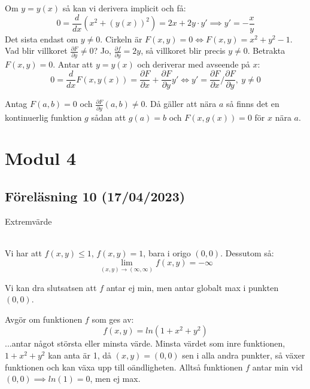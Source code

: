 \documentclass{report}
\begin{document}
{
Om $ y = y(x) $ så kan vi derivera implicit och få:
\begin{equation*}
0 = \frac{d}{dx}(x^2+(y(x))^2) = 2x+2y \cdot y' \implies y' = - \frac{x}{y}
\end{equation*}
Det sista endast om $ y \ne 0 $. Cirkeln är $ F(x,y) = 0 \iff F(x,y) = x^2+y^2-1 $. Vad blir villkoret $ \frac{\partial F }{\partial y } \ne 0 $? Jo, $ \frac{\partial f }{\partial y } = 2y $, så villkoret blir precis $ y \ne 0 $. Betrakta $ F(x,y) = 0 $. Antar att $ y = y(x) $ och deriverar med avseende på $ x $:
\begin{equation*}
0 = \frac{d}{dx} F(x,y(x)) = \frac{\partial F }{\partial x } + \frac{\partial F }{\partial y } y' \iff y' = \frac{\partial F }{\partial x } / \frac{\partial F }{\partial y }, \: y \ne 0 
\end{equation*}
}

\pagebreak
\thm{}
{
Antag $ F(a,b) = 0 $ och $ \frac{\partial F }{\partial y }(a,b) \ne 0$. Då gäller att nära $ a $ så finns det en kontinuerlig funktion $ g $ sådan att $ g(a) = b $ och $ F(x, g(x)) = 0 $ för $ x $ nära $ a $.
}

\pagebreak
\chapter{Modul 4}
\section{Föreläsning 10 (17/04/2023)}
Extremvärde\\\\


{
Vi har att $ f(x,y) \le 1 $, $ f(x,y) = 1 $, bara i origo $ (0,0) $. Dessutom så:
\begin{equation*}
\lim_{(x,y) \to ( \infty, \infty)} f(x,y) = - \infty
\end{equation*}

Vi kan dra slutsatsen att $ f $ antar ej min, men antar globalt max i punkten $ (0,0) $.
}

\vspace{20pt}
\qs{}
{
Avgör om funktionen $ f $ som ges av:
\begin{equation*}
f(x,y) = ln(1+x^2+y^2)
\end{equation*}
...antar något största eller minsta värde.
}
\sol Minsta värdet som inre funktionen, $ 1+x^2+y^2 $ kan anta är 1, då $ (x,y) = (0,0) $ sen i alla andra punkter, så växer funktionen och kan växa upp till oändligheten. Alltså funktionen $ f $ antar min vid $ (0,0) \implies ln(1) = 0 $, men ej max.
\vspace{20pt}
\end{document}
